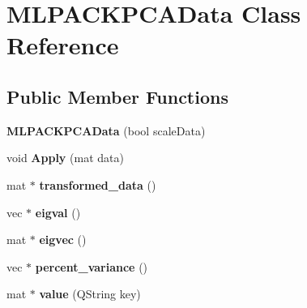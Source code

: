 \hypertarget{class_m_l_p_a_c_k_p_c_a_data}{\section{M\+L\+P\+A\+C\+K\+P\+C\+A\+Data Class Reference}
\label{class_m_l_p_a_c_k_p_c_a_data}
}
\subsection*{Public Member Functions}
\begin{DoxyCompactItemize}
\item 
\hypertarget{class_m_l_p_a_c_k_p_c_a_data_a7e74896b4d001b408f9e23d1fd081783}{{\bfseries M\+L\+P\+A\+C\+K\+P\+C\+A\+Data} (bool scale\+Data)}\label{class_m_l_p_a_c_k_p_c_a_data_a7e74896b4d001b408f9e23d1fd081783}

\item 
\hypertarget{class_m_l_p_a_c_k_p_c_a_data_a2d6b72afc6414f966b7054fd28781231}{void {\bfseries Apply} (mat data)}\label{class_m_l_p_a_c_k_p_c_a_data_a2d6b72afc6414f966b7054fd28781231}

\item 
\hypertarget{class_m_l_p_a_c_k_p_c_a_data_a216d23432c97d15e902c2a927fa0aea7}{mat $\ast$ {\bfseries transformed\+\_\+data} ()}\label{class_m_l_p_a_c_k_p_c_a_data_a216d23432c97d15e902c2a927fa0aea7}

\item 
\hypertarget{class_m_l_p_a_c_k_p_c_a_data_a060a2c78b84c48bdc23456de9cc791c9}{vec $\ast$ {\bfseries eigval} ()}\label{class_m_l_p_a_c_k_p_c_a_data_a060a2c78b84c48bdc23456de9cc791c9}

\item 
\hypertarget{class_m_l_p_a_c_k_p_c_a_data_a6e673eb09d5e2383dde96c6a3382fe72}{mat $\ast$ {\bfseries eigvec} ()}\label{class_m_l_p_a_c_k_p_c_a_data_a6e673eb09d5e2383dde96c6a3382fe72}

\item 
\hypertarget{class_m_l_p_a_c_k_p_c_a_data_a14eb1f5cc007a4404da1070921d93eb8}{vec $\ast$ {\bfseries percent\+\_\+variance} ()}\label{class_m_l_p_a_c_k_p_c_a_data_a14eb1f5cc007a4404da1070921d93eb8}

\item 
\hypertarget{class_m_l_p_a_c_k_p_c_a_data_aca6226b8560b1df2d88f221e50423db4}{mat $\ast$ {\bfseries value} (Q\+String key)}\label{class_m_l_p_a_c_k_p_c_a_data_aca6226b8560b1df2d88f221e50423db4}

\end{DoxyCompactItemize}


